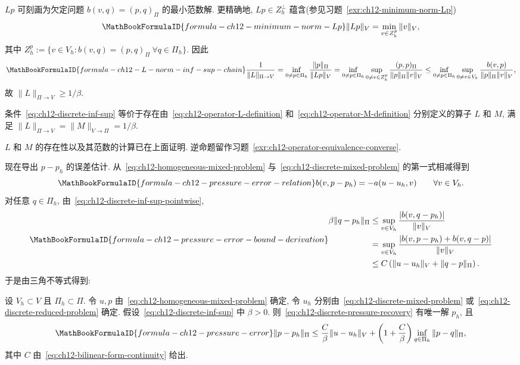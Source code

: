$Lp$ 可刻画为欠定问题 $b(v,q)=(p,q)_\Pi$ 的最小范数解. 更精确地, $Lp\in Z_h^\perp$ 蕴含(参见习题~\ref{exr:ch12-minimum-norm-Lp})
\begin{equation}
\MathBookFormulaID{formula-ch12-minimum-norm-Lp}
\label{eq:ch12-minimum-norm-Lp}
\|Lp\|_V=\min_{v\in Z_h^p}\|v\|_V,
\end{equation}
其中 $Z_h^p:=\{v\in V_h:b(v,q)=(p,q)_\Pi\ \forall q\in\Pi_h\}$. 因此
\[
\MathBookFormulaID{formula-ch12-L-norm-inf-sup-chain}
\frac1{\|L\|_{\Pi\to V}}
=\inf_{0\neq p\in\Pi_h}\frac{\|p\|_\Pi}{\|Lp\|_V}
=\inf_{0\neq p\in\Pi_h}\sup_{0\neq v\in Z_h^p}
\frac{(p,p)_\Pi}{\|p\|_\Pi\|v\|_V}
\leq\inf_{0\neq p\in\Pi_h}\sup_{0\neq v\in V_h}
\frac{b(v,p)}{\|p\|_\Pi\|v\|_V},
\]
故 $\|L\|_{\Pi\to V}\geq1/\beta$.

\begin{Lemma}
\label{lem:ch12-inf-sup-operator-equivalence}
条件~\eqref{eq:ch12-discrete-inf-sup} 等价于存在由~\eqref{eq:ch12-operator-L-definition} 和~\eqref{eq:ch12-operator-M-definition} 分别定义的算子 $L$ 和 $M$, 满足
$\|L\|_{\Pi\to V}=\|M\|_{V\to\Pi}=1/\beta$.
\end{Lemma}

\begin{Proof}
$L$ 和 $M$ 的存在性以及其范数的计算已在上面证明. 逆命题留作习题~\ref{exr:ch12-operator-equivalence-converse}.
\end{Proof}

现在导出 $p-p_h$ 的误差估计. 从~\eqref{eq:ch12-homogeneous-mixed-problem} 与~\eqref{eq:ch12-discrete-mixed-problem} 的第一式相减得到
\begin{equation}
\MathBookFormulaID{formula-ch12-pressure-error-relation}
\label{eq:ch12-pressure-error-relation}
b(v,p-p_h)=-a(u-u_h,v)\qquad\forall v\in V_h.
\end{equation}
对任意 $q\in\Pi_h$, 由~\eqref{eq:ch12-discrete-inf-sup-pointwise},
\[
\MathBookFormulaID{formula-ch12-pressure-error-bound-derivation}
\begin{aligned}
\beta\|q-p_h\|_\Pi
&\leq\sup_{v\in V_h}\frac{|b(v,q-p_h)|}{\|v\|_V}\\
&=\sup_{v\in V_h}\frac{|b(v,p-p_h)+b(v,q-p)|}{\|v\|_V}\\
&\leq C\left(\|u-u_h\|_V+\|q-p\|_\Pi\right).
\end{aligned}
\]
于是由三角不等式得到:

\begin{Theorem}
\label{thm:ch12-pressure-error}
设 $V_h\subset V$ 且 $\Pi_h\subset\Pi$. 令 $u,p$ 由~\eqref{eq:ch12-homogeneous-mixed-problem} 确定, 令 $u_h$ 分别由~\eqref{eq:ch12-discrete-mixed-problem} 或~\eqref{eq:ch12-discrete-reduced-problem} 确定. 假设~\eqref{eq:ch12-discrete-inf-sup} 中 $\beta>0$. 则~\eqref{eq:ch12-discrete-pressure-recovery} 有唯一解 $p_h$, 且
\[
\MathBookFormulaID{formula-ch12-pressure-error}
\|p-p_h\|_\Pi
\leq\frac C\beta\|u-u_h\|_V
+\left(1+\frac C\beta\right)
\inf_{q\in\Pi_h}\|p-q\|_\Pi,
\]
其中 $C$ 由~\eqref{eq:ch12-bilinear-form-continuity} 给出.
\end{Theorem}

